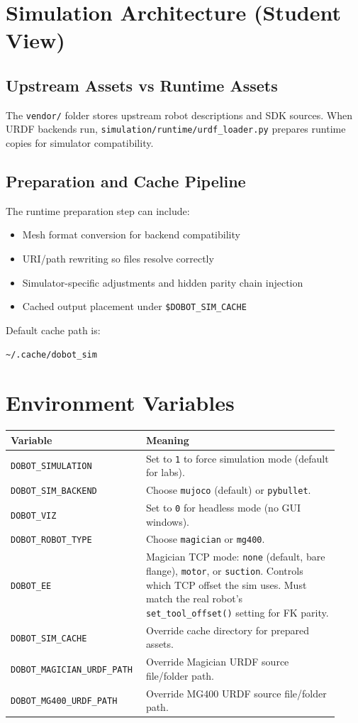 \documentclass[11pt,a4paper]{article}
\begin{document}
\section{Simulation Architecture (Student View)}
\subsection*{Upstream Assets vs Runtime Assets}
The \texttt{vendor/} folder stores upstream robot descriptions and SDK sources.
When URDF backends run, \texttt{simulation/runtime/urdf\_loader.py} prepares
runtime copies for simulator compatibility.

\subsection*{Preparation and Cache Pipeline}
The runtime preparation step can include:
\begin{itemize}
  \item Mesh format conversion for backend compatibility
  \item URI/path rewriting so files resolve correctly
  \item Simulator-specific adjustments and hidden parity chain injection
  \item Cached output placement under \texttt{\$DOBOT\_SIM\_CACHE}
\end{itemize}

Default cache path is:
\begin{verbatim}
~/.cache/dobot_sim
\end{verbatim}

\section{Environment Variables}
\begin{longtable}{|p{0.34\linewidth}|p{0.58\linewidth}|}
\hline
\textbf{Variable} & \textbf{Meaning} \\
\hline
\texttt{DOBOT\_SIMULATION} & Set to \texttt{1} to force simulation mode (default for labs). \\
\hline
\texttt{DOBOT\_SIM\_BACKEND} & Choose \texttt{mujoco} (default) or \texttt{pybullet}. \\
\hline
\texttt{DOBOT\_VIZ} & Set to \texttt{0} for headless mode (no GUI windows). \\
\hline
\texttt{DOBOT\_ROBOT\_TYPE} & Choose \texttt{magician} or \texttt{mg400}. \\
\hline
\texttt{DOBOT\_EE} & Magician TCP mode: \texttt{none} (default, bare flange),
  \texttt{motor}, or \texttt{suction}. Controls which TCP offset the sim uses.
  Must match the real robot's \texttt{set\_tool\_offset()} setting for FK parity. \\
\hline
\texttt{DOBOT\_SIM\_CACHE} & Override cache directory for prepared assets. \\
\hline
\texttt{DOBOT\_MAGICIAN\_URDF\_PATH} & Override Magician URDF source file/folder path. \\
\hline
\texttt{DOBOT\_MG400\_URDF\_PATH} & Override MG400 URDF source file/folder path. \\
\hline
\end{longtable}
\end{document}
